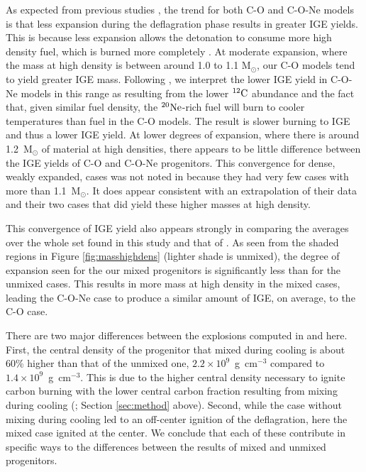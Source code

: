 \documentclass[iop,apj]{emulateapj}
\newcommand{\C}[1]{\ensuremath{{}^{#1}{\rm C}}}
\newcommand{\Ne}[1]{\ensuremath{{}^{#1}{\rm Ne}}}
\begin{document}
As expected from previous studies \citep[e.g.][]{townetal2009}, the trend for both C-O and C-O-Ne
models is that less expansion during the deflagration phase results in
greater IGE yields.
This is because less expansion allows the detonation to consume more high density fuel, which is burned more completely \citep[See discussion in][and references therein]{SeitenzahlTownsley2017}.
At moderate expansion, where the mass at high density is between around 1.0 to 1.1 M$_\odot$, our C-O models tend to yield greater IGE mass.
Following
\citet{willcoxetal2016}, we interpret
the lower IGE yield in C-O-Ne models in this range as resulting
from the lower \C{12} abundance and the fact that, given
similar fuel density, the \Ne{20}-rich fuel will burn to cooler
temperatures than fuel in the C-O models. The result is
slower burning to IGE and thus a lower IGE yield.
At lower degrees of expansion, where there is around 1.2~M$_\odot$ of material at high densities, there appears to be little difference between the IGE yields of C-O and C-O-Ne progenitors.
This convergence for dense, weakly expanded, cases was not noted in \citet{willcoxetal2016} because they had very few cases with more than 1.1~M$_\odot$.
It does appear consistent with an extrapolation of their data and their two cases that did yield these higher masses at high density.

This convergence of IGE yield also appears strongly in comparing the averages over the whole set found in this study and that of \citet{willcoxetal2016}.
As seen from the shaded regions in Figure \ref{fig:masshighdens} (lighter shade is unmixed), the degree of expansion seen for the our mixed progenitors is significantly less than for the unmixed cases.
This results in more mass at high density in the mixed cases, leading the C-O-Ne case to produce a similar amount of IGE, on average, to the C-O case.

There are two major differences between the explosions computed in \citet{willcoxetal2016} and here.
First, the central density of the progenitor that mixed during cooling is about 60\% higher than that of the unmixed one, $2.2\times10^9$~g~cm$^{-3}$ compared to $1.4\times 10^9$~g~cm$^{-3}$.
This is due to the higher central density necessary to ignite carbon burning with the lower central carbon fraction resulting from mixing during cooling
(\citealt{brooksetal2017}; Section \ref{sec:method} above).
Second, while the case without mixing during cooling led to an off-center ignition of the deflagration, here the mixed case ignited at the center.
We conclude that each of these contribute in specific ways to the differences between the results of mixed and unmixed progenitors.
\end{document}
